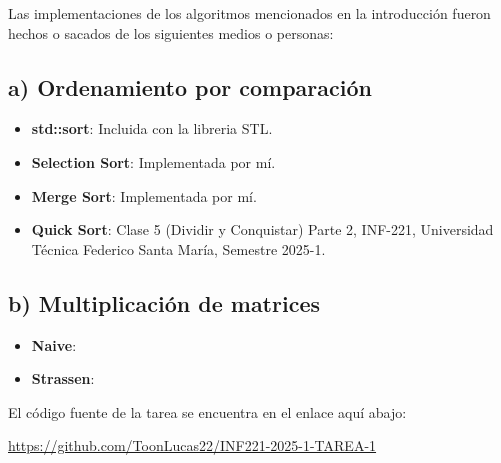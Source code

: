 Las implementaciones de los algoritmos mencionados en la introducción fueron hechos o sacados de los siguientes medios o personas:

\subsection{a) Ordenamiento por comparación}

\begin{itemize}
\item \textbf{std::sort}: Incluida con la libreria STL.
\item \textbf{Selection Sort}: Implementada por mí.
\item \textbf{Merge Sort}: Implementada por mí.
\item \textbf{Quick Sort}: Clase 5 (Dividir y Conquistar) Parte 2, INF-221, Universidad Técnica Federico Santa María, Semestre 2025-1.
\end{itemize}

\subsection{b) Multiplicación de matrices}

 \begin{itemize}
     \item \textbf{Naive}:
     \item \textbf{Strassen}:
 \end{itemize}


El código fuente de la tarea se encuentra en el enlace aquí abajo:
\begin{mdframed}
    \begin{center}
        \Large \url{https://github.com/ToonLucas22/INF221-2025-1-TAREA-1}
    \end{center}
\end{mdframed}


